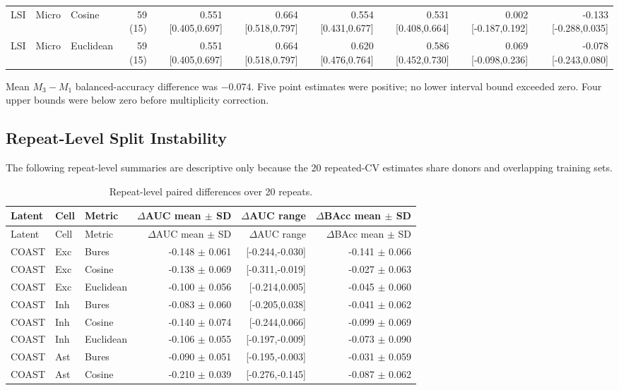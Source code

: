 \documentclass[9pt]{article}
\begin{document}
\begin{landscape}
\begin{longtable}{lllrrrrrrr}
LSI & Micro & Cosine & 59 (15) & 0.551 [0.405,0.697] & 0.664 [0.518,0.797] & 0.554 [0.431,0.677] & 0.531 [0.408,0.664] & 0.002 [-0.187,0.192] & -0.133 [-0.288,0.035] \\
LSI & Micro & Euclidean & 59 (15) & 0.551 [0.405,0.697] & 0.664 [0.518,0.797] & 0.620 [0.476,0.764] & 0.586 [0.452,0.730] & 0.069 [-0.098,0.236] & -0.078 [-0.243,0.080] \\
\bottomrule
\end{longtable}
\footnotesize
Mean $M_3-M_1$ balanced-accuracy difference was $-0.074$. Five point estimates were positive; no lower interval bound exceeded zero. Four upper bounds were below zero before multiplicity correction.
\end{landscape}

\begin{landscape}
\section{Repeat-Level Split Instability}
The following repeat-level summaries are descriptive only because the 20 repeated-CV estimates share donors and overlapping training sets.
\footnotesize
\begin{longtable}{lllrrr}
\caption{Repeat-level paired differences over 20 repeats.}\\
\toprule
Latent & Cell & Metric & $\Delta$AUC mean $\pm$ SD & $\Delta$AUC range & $\Delta$BAcc mean $\pm$ SD \\
\midrule
\endfirsthead
\toprule
Latent & Cell & Metric & $\Delta$AUC mean $\pm$ SD & $\Delta$AUC range & $\Delta$BAcc mean $\pm$ SD \\
\midrule
\endhead
COAST & Exc & Bures & -0.148 $\pm$ 0.061 & [-0.244,-0.030] & -0.141 $\pm$ 0.066 \\
COAST & Exc & Cosine & -0.138 $\pm$ 0.069 & [-0.311,-0.019] & -0.027 $\pm$ 0.063 \\
COAST & Exc & Euclidean & -0.100 $\pm$ 0.056 & [-0.214,0.005] & -0.045 $\pm$ 0.060 \\
COAST & Inh & Bures & -0.083 $\pm$ 0.060 & [-0.205,0.038] & -0.041 $\pm$ 0.062 \\
COAST & Inh & Cosine & -0.140 $\pm$ 0.074 & [-0.244,0.066] & -0.099 $\pm$ 0.069 \\
COAST & Inh & Euclidean & -0.106 $\pm$ 0.055 & [-0.197,-0.009] & -0.073 $\pm$ 0.090 \\
COAST & Ast & Bures & -0.090 $\pm$ 0.051 & [-0.195,-0.003] & -0.031 $\pm$ 0.059 \\
COAST & Ast & Cosine & -0.210 $\pm$ 0.039 & [-0.276,-0.145] & -0.087 $\pm$ 0.062 \\

\end{longtable}
\end{landscape}
\end{document}
